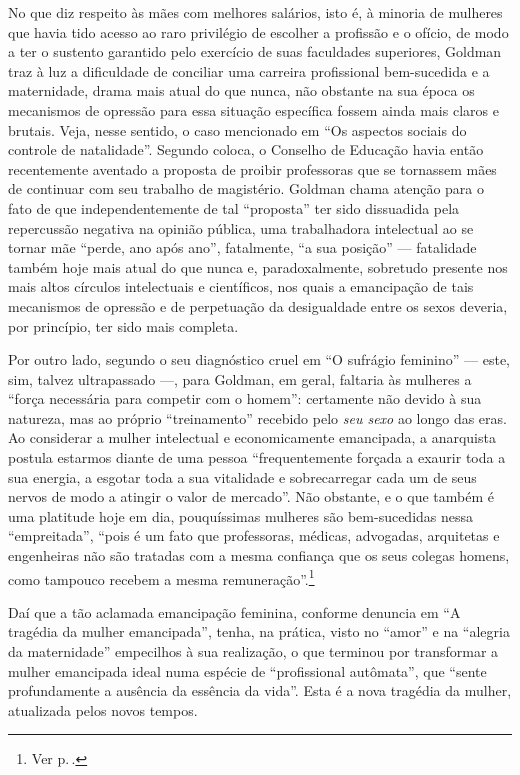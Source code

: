 No que diz respeito às mães com melhores salários, isto é, à minoria de
mulheres que havia tido acesso ao raro privilégio de escolher a
profissão e o ofício, de modo a ter o sustento garantido pelo exercício
de suas faculdades superiores, Goldman traz à luz a dificuldade de
conciliar uma carreira profissional bem-sucedida e a maternidade, drama
mais atual do que nunca, não obstante na sua época os mecanismos de
opressão para essa situação específica fossem ainda mais claros e
brutais. Veja, nesse sentido, o caso mencionado em ``Os aspectos
sociais do controle de natalidade''. Segundo coloca, o Conselho de
Educação havia então recentemente aventado a proposta de proibir
professoras que se tornassem mães de continuar com seu trabalho de
magistério. Goldman chama atenção para o fato de que independentemente
de tal ``proposta'' ter sido dissuadida pela repercussão negativa na
opinião pública, uma trabalhadora intelectual ao se tornar mãe ``perde,
ano após ano'', fatalmente, ``a sua posição'' --- fatalidade também hoje
mais atual do que nunca e, paradoxalmente, sobretudo presente nos mais
altos círculos intelectuais e científicos, nos quais a emancipação de
tais mecanismos de opressão e de perpetuação da desigualdade entre os
sexos deveria, por princípio, ter sido mais completa.

Por outro lado, segundo o seu diagnóstico cruel em ``O sufrágio
feminino'' --- este, sim, talvez ultrapassado ---, para Goldman, em geral,
faltaria às mulheres a ``força necessária para competir com o homem'':
certamente não devido à sua natureza, mas ao próprio ``treinamento''
recebido pelo \textit{seu sexo} ao longo das eras. Ao considerar a mulher
intelectual e economicamente emancipada, a anarquista postula estarmos
diante de uma pessoa ``frequentemente forçada a exaurir toda a sua
energia, a esgotar toda a sua vitalidade e sobrecarregar cada um de seus
nervos de modo a atingir o valor de mercado''. Não obstante, e o que
também é uma platitude hoje em dia, pouquíssimas mulheres são
bem-sucedidas nessa ``empreitada'', ``pois é um fato que
professoras, médicas, advogadas, arquitetas e engenheiras não são
tratadas com a mesma confiança que os seus colegas homens, como tampouco
recebem a mesma remuneração''.\footnote{Ver p.\,\pageref{igualdade}.}

Daí que a tão aclamada emancipação
feminina, conforme denuncia em ``A tragédia da mulher emancipada'',
tenha, na prática, visto no ``amor'' e na ``alegria da maternidade''
empecilhos à sua realização, o que terminou por transformar a mulher
emancipada ideal numa espécie de ``profissional autômata'', que ``sente
profundamente a ausência da essência da vida''. Esta é a nova tragédia
da mulher, atualizada pelos novos tempos. 

